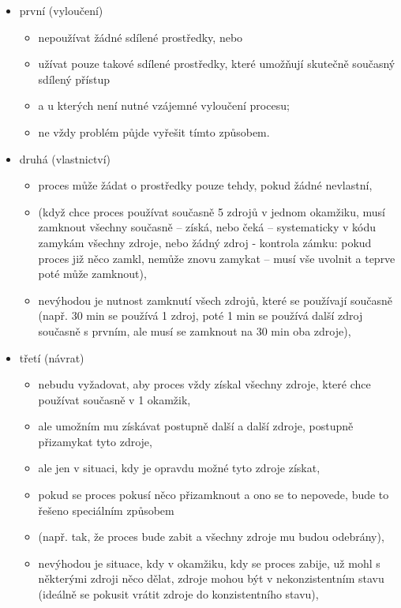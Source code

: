 \documentclass[a4paper, 11pt]{article}
\begin{document}
\begin{itemize}
    \item první (vyloučení)
    \begin{itemize}
        \item nepoužívat žádné sdílené prostředky, nebo 
        \item užívat pouze takové sdílené prostředky, které umožňují skutečně současný sdílený přístup
        \item a u kterých není nutné vzájemné vyloučení procesu;
        \item ne vždy problém půjde vyřešit tímto způsobem.
    \end{itemize}
    
    \item druhá (vlastnictví)
    \begin{itemize}
        \item proces může žádat o prostředky pouze tehdy, pokud žádné nevlastní,
        \item (když chce proces používat současně 5 zdrojů v jednom okamžiku, musí zamknout všechny současně -- získá, nebo čeká -- systematicky v kódu zamykám všechny zdroje, nebo žádný zdroj - kontrola zámku: pokud proces již něco zamkl, nemůže znovu zamykat -- musí vše uvolnit a teprve poté může zamknout),
        \item nevýhodou je nutnost zamknutí všech zdrojů, které se používají současně (např. 30 min se používá 1 zdroj, poté 1 min se používá další zdroj současně s prvním, ale musí se zamknout na 30 min oba zdroje),
    \end{itemize}
    
    \item třetí (návrat)
    \begin{itemize}
        \item nebudu vyžadovat, aby proces vždy získal všechny zdroje, které chce používat současně v 1 okamžik,
        \item ale umožním mu získávat postupně další a další zdroje, postupně přizamykat tyto zdroje,
        \item ale jen v situaci, kdy je opravdu možné tyto zdroje získat,
        \item pokud se proces pokusí něco přizamknout a ono se to nepovede, bude to řešeno speciálním způsobem
        \item (např. tak, že proces bude zabit a všechny zdroje mu budou odebrány),
        \item nevýhodou je situace, kdy v okamžiku, kdy se proces zabije, už mohl s některými zdroji něco dělat, zdroje mohou být v nekonzistentním stavu (ideálně se pokusit vrátit zdroje do konzistentního stavu),
    \end{itemize}
    

\end{itemize}
\end{document}
